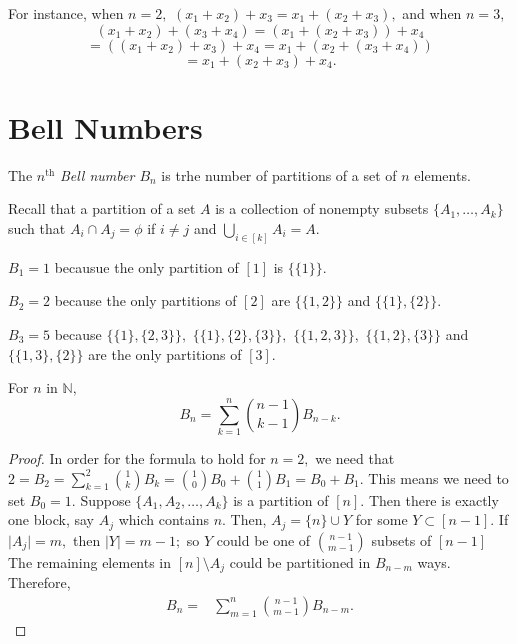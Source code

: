 For instance, when $n=2,$
$(x_1+  x_2) + x_3 = x_1  +(x_2 + x_3),$ and
when $n=3,$ 
$$(x_1 + x_2) + (x_3 + x_4) = (x_1 + (x_2 + x_3)) + x_4 $$
$$ = ((x_1 + x_2) + x_3) + x_4 = x_1 + (x_2 + (x_3 + x_4))$$
$$ = x_1 + (x_2 + x_3 ) +x_4 .$$

\section{Bell Numbers}
\begin{definition}
The $n^\text{th}$ \emph{Bell number $B_n$} is trhe number of partitions
of a set of $n$ elements.
\end{definition}

Recall that a partition of a set $A$ is a collection of nonempty
subsets $ \{ A_1, \dotsc, A_k\}$ such that 
$A_i \cap A_j =  \phi$ if $i \not = j$ and $\bigcup_{i \in [k]} A_i = A.$

\begin{example}
	$B_1 = 1$ becausue the only partition of $[1]$ is $\{\{1\}\}.$

	$B_2 = 2$ because the only partitions of $[2]$ are
	$\{ \{ 1,2\} \}$ and $\{ \{1\}, \{2\} \}.$

	$B_3 = 5$ because $\{ \{ 1\} , \{ 2, 3\} \},$ 
	$\{ \{1 \}, \{2\}, \{3\}\},$ $\{ \{ 1,2,3\}\},$
	$\{ \{1, 2\}, \{3\}\}$ and $\{ \{1,3\}, \{2\}\}$
	are the only partitions of $[3].$
\end{example}

\begin{lemma}
	For $n$ in $\mathbb{N},$
	$$ B_n = \sum_{k = 1}^{n} \binom{n-1}{k-1} B_{n-k}.$$
\end{lemma}

\begin{proof}
	In order for the formula to hold for $n=2,$ we need that	$2 = B_2 = \sum_{k=1}^{2} \binom{1}{k} B_k
	= \binom{1}{0} B_0 + \binom{1}{1} B_1
	= B_0 + B_1.$
	This means we need to set $B_0 = 1.$
	Suppose $ \{ A_1, A_2, \dotsc, A_k \}$ is a partition of $[n].$
	Then there is exactly one block, say $A_j$ which contains $n.$
	Then, $A_j = \{n\} \cup Y$ for some $ Y \subset [n-1].$
	If $ \lvert A_j \rvert = m,$ then $ \lvert Y \rvert = m-1;$ 
	so $Y$ could be one of $\binom{n-1}{m-1}$ subsets of $[n-1]$
	The remaining elements in $[n] \setminus A_j$ could be 
	partitioned in $B_{n-m}$ ways.
	Therefore,
	\begin{align*}
		B_n ={}&  \sum_{m=1}^{n} \binom{n-1}{m-1} B_{n-m}.
	\end{align*}
\end{proof}

